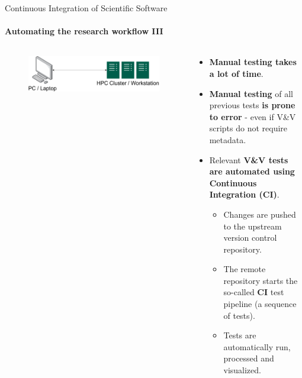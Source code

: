 \begin{frame}{Continuous Integration of Scientific Software}
    \framesubtitle{Automating the research workflow III} 
    \vfill

        \begin{columns}
            \begin{column}[c]{0.5\textwidth}
                \begin{figure}
                    \centering
                    \includegraphics[width=\columnwidth]{figures/workflow-overview.png}
                \end{figure}
            \end{column}
            \begin{column}[c]{0.5\textwidth}
                \begin{itemize}
                    \item \textbf{Manual testing takes a lot of time}. 
                    \item \textbf{Manual testing} of all previous tests \textbf{is prone to error} - even if V\&V scripts do not require metadata. 
                    \item Relevant \textbf{V\&V tests are automated using Continuous Integration (CI)}.  
                    \begin{itemize}
                        \item Changes are pushed to the upstream version control repository.  
                        \item The remote repository starts the so-called \textbf{CI} test pipeline (a sequence of tests). 
                        \item Tests are automatically run, processed and visualized. 
                    \end{itemize}
                \end{itemize}
            \end{column}
        \end{columns}
\end{frame}

